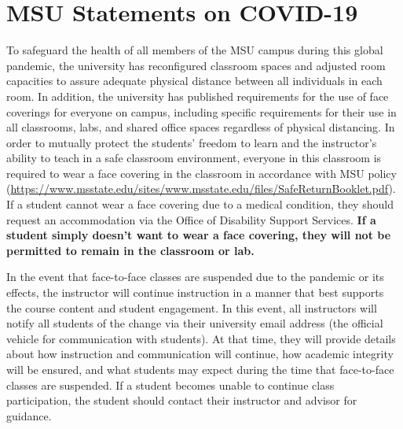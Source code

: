 
\section{MSU Statements on COVID-19}

To safeguard the health of all members of the MSU campus during this global pandemic, the university has reconfigured classroom spaces and adjusted room capacities to assure adequate physical distance between all individuals in each room.  In addition, the university has published requirements for the use of face coverings for everyone on campus, including specific requirements for their use in all classrooms, labs, and shared office spaces regardless of physical distancing.  In order to mutually protect the students’ freedom to learn and the instructor’s ability to teach in a safe classroom environment, everyone in this classroom is required to wear a face covering in the classroom in accordance with MSU policy (\url{https://www.msstate.edu/sites/www.msstate.edu/files/SafeReturnBooklet.pdf}).  If a student cannot wear a face covering due to a medical condition, they should request an accommodation via the Office of Disability Support Services.  \textbf{If a student simply doesn’t want to wear a face covering, they will not be permitted to remain in the classroom or lab.}

In the event that face-to-face classes are suspended due to the pandemic or its effects, the instructor will continue instruction in a manner that best supports the course content and student engagement. In this event, all instructors will notify all students of the change via their university email address (the official vehicle for communication with students).  At that time, they will provide details about how instruction and communication will continue, how academic integrity will be ensured, and what students may expect during the time that face-to-face classes are suspended. If a student becomes unable to continue class participation, the student should contact their instructor and advisor for guidance.
